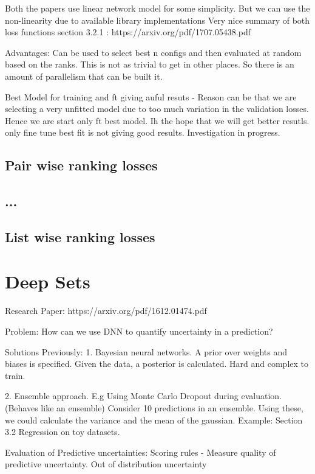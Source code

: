 \documentclass[11pt]{report}
\begin{document}
    Both the papers use linear network model for some simplicity. But we can use the non-linearity due to available library
        implementations
    Very nice summary of both loss functions section 3.2.1 : https://arxiv.org/pdf/1707.05438.pdf 

Advantages:
    Can be used to select best n configs and then evaluated at random based on the ranks. This is not as trivial to get in other
    places. So there is an amount of parallelism that can be built it.

Best Model for training and ft giving auful resuts - Reason can be that we are selecting a very unfitted model due to too much variation in the validation losses.
Hence we are start only ft best model. Ih the hope that we will get better resutls.
only fine tune best fit is not giving good results. Investigation in progress.


\subsection{Pair wise ranking losses}
\subsection{...}
\subsection{List wise ranking losses}


\section{Deep Sets}
Research Paper: https://arxiv.org/pdf/1612.01474.pdf

Problem: How can we use DNN to quantify uncertainty in a prediction?

Solutions Previously:
    1. Bayesian neural networks.
       A prior over weights and biases is specified. Given the data, a posterior is calculated.
       Hard and complex to train.

    2. Ensemble approach. E.g Using Monte Carlo Dropout during evaluation. (Behaves like an ensemble)
       Consider 10 predictions in an ensemble. Using these, we could calculate the variance and the
       mean of the gaussian. Example: Section 3.2 Regression on toy datasets.

Evaluation of Predictive uncertainties:
    Scoring rules - Measure quality of predictive uncertainty.
    Out of distribution uncertainty
\end{document}
